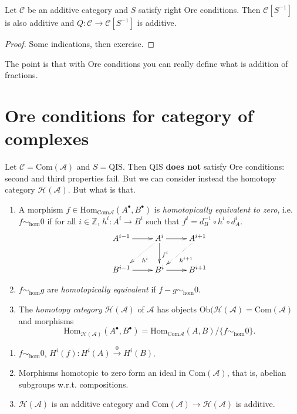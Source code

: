 \begin{proposition}
\label{proposition-Ore-conditions}
Let $\mathcal{C}$ be an additive category and
$S$ satisfy right Ore conditions. Then
$\mathcal{C}[S^{-1}]$ is also additive and
$Q:\mathcal{C} \to
\mathcal{C}[S^{-1}]$ is additive.
\end{proposition}

\begin{proof}
Some indications, then exercise.
\end{proof}

The point is that with Ore conditions you can
really define what is addition of fractions.

\section{Ore conditions for category of
complexes}
\label{dcos-label-004}

Let $\mathcal{C}=\text{Com}(\mathcal{A})$ and
$S=\text{QIS}$. Then QIS {\bf does not}
satisfy Ore conditions: second and third
properties fail. But we can consider instead
the homotopy category
$\mathcal{H}(\mathcal{A})$. But what is that.

\begin{definition}
\label{definition-homotopy-category}
\begin{enumerate}
\item
A morphism $f \in
\text{Hom}_{\text{Com}\mathcal{A}}
(A^{\bullet}
,B^{\bullet})$
is {\it homotopically equivalent to zero},
i.e. $f \sim_{\text{hom}}0$ if for all $i\in
\mathbb{Z}$, $h^i:A^i \to B^i$ such that
$f^i=d_B^{-1}\circ h^i \circ d_A^i$.
$$
\xymatrix{
A^{i-1}\ar[r]&
A^{i}\ar[r]\ar@{.>}[dl]^{h^i}\ar[d]^{f^i}&
A^{i+1}\ar@{.>}[dl]^{h^{i+1}}\\
B^{i-1}\ar[r]& B^i\ar[r]& B^{i+1}
}
$$
\item $f\sim_{\text{hom}}g$ are {\it
homotopically equivalent} if $f-g
\sim_{\text{hom}}0$.
\item The {\it homotopy category}
$\mathcal{H}(\mathcal{A})$ of $\mathcal{A}$
has objects
$\text{Ob}(\mathcal{H}(\mathcal{A})=
\text{Com}
(\mathcal{A})$
and morphisms
$$
\text{Hom}_{\mathcal{H}(\mathcal{A})
}(A^{\bullet},B^{\bullet})
=\text{Hom}_{\text{Com}\mathcal{A}}(A,B
)\Big/\{f\sim_{\text{hom}}0\}.
$$
\end{enumerate}
\end{definition}

\begin{exercise}
\label{exercise-homotopy-category}
\begin{enumerate}
\item $f\sim_{\text{hom}}0$,
$H^i(f):H^i(A)\xrightarrow{0}H^i(B)$.
\item Morphisms homotopic to zero form an
ideal in $\text{Com}(\mathcal{A})$,
that is, abelian subgroups w.r.t.
compositions.
\item $\mathcal{H}(\mathcal{A})$ is an
additive category and
$\text{Com}(\mathcal{A}) \to
\mathcal{H}(\mathcal{A})$ is additive.
\end{enumerate}
\end{exercise}

